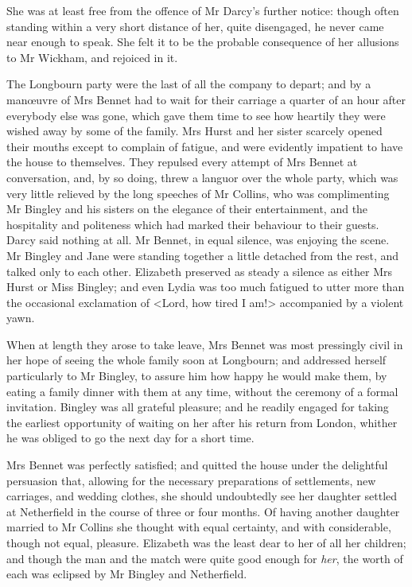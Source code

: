She was at least free from the offence of Mr Darcy's further notice: though often standing within a very short distance of her, quite disengaged, he never came near enough to speak. She felt it to be the probable consequence of her allusions to Mr Wickham, and rejoiced in it.

The Longbourn party were the last of all the company to depart; and by a manœuvre of Mrs Bennet had to wait for their carriage a quarter of an hour after everybody else was gone, which gave them time to see how heartily they were wished away by some of the family. Mrs Hurst and her sister scarcely opened their mouths except to complain of fatigue, and were evidently impatient to have the house to themselves. They repulsed every attempt of Mrs Bennet at conversation, and, by so doing, threw a languor over the whole party, which was very little relieved by the long speeches of Mr Collins, who was complimenting Mr Bingley and his sisters on the elegance of their entertainment, and the hospitality and politeness which had marked their behaviour to their guests. Darcy said nothing at all. Mr Bennet, in equal silence, was enjoying the scene. Mr Bingley and Jane were standing together a little detached from the rest, and talked only to each other. Elizabeth preserved as steady a silence as either Mrs Hurst or Miss Bingley; and even Lydia was too much fatigued to utter more than the occasional exclamation of <Lord, how tired I am!> accompanied by a violent yawn.

When at length they arose to take leave, Mrs Bennet was most pressingly civil in her hope of seeing the whole family soon at Longbourn; and addressed herself particularly to Mr Bingley, to assure him how happy he would make them, by eating a family dinner with them at any time, without the ceremony of a formal invitation. Bingley was all grateful pleasure; and he readily engaged for taking the earliest opportunity of waiting on her after his return from London, whither he was obliged to go the next day for a short time.

Mrs Bennet was perfectly satisfied; and quitted the house under the delightful persuasion that, allowing for the necessary preparations of settlements, new carriages, and wedding clothes, she should undoubtedly see her daughter settled at Netherfield in the course of three or four months. Of having another daughter married to Mr Collins she thought with equal certainty, and with considerable, though not equal, pleasure. Elizabeth was the least dear to her of all her children; and though the man and the match were quite good enough for \textit{her}, the worth of each was eclipsed by Mr Bingley and Netherfield.